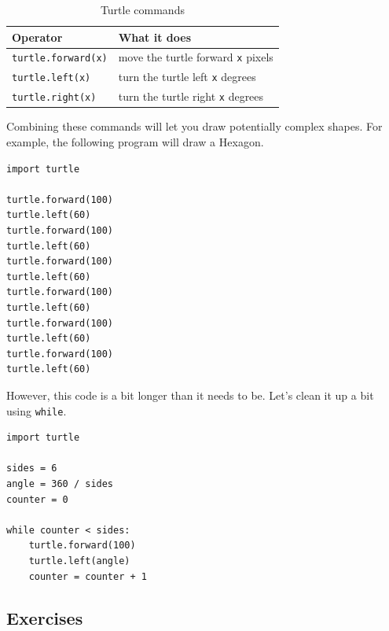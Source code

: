 \documentclass[11pt,hidelinks]{article}
\begin{document}
\begin{table}[h]
  \centering
  \begin{tabular}{ll}
    \toprule
    Operator & What it does\\
    \midrule
    \lstinline!turtle.forward(x)! & move the turtle forward \lstinline!x! pixels \\
    \lstinline!turtle.left(x)! & turn the turtle left \lstinline!x! degrees \\
    \lstinline!turtle.right(x)! & turn the turtle right \lstinline!x! degrees \\
    \bottomrule
  \end{tabular}
  \caption{Turtle commands}
  \label{tab:turtle}
\end{table}

Combining these commands will let you draw potentially complex shapes. For example, the following program will draw a Hexagon.

\begin{lstlisting}[style=python]
import turtle

turtle.forward(100)
turtle.left(60)
turtle.forward(100)
turtle.left(60)
turtle.forward(100)
turtle.left(60)
turtle.forward(100)
turtle.left(60)
turtle.forward(100)
turtle.left(60)
turtle.forward(100)
turtle.left(60)
\end{lstlisting}

However, this code is a bit longer than it needs to be. Let's clean it up a bit using \lstinline{while}.

\begin{lstlisting}[style=python]
import turtle

sides = 6
angle = 360 / sides
counter = 0

while counter < sides:
    turtle.forward(100)
    turtle.left(angle)
    counter = counter + 1
\end{lstlisting}

\subsection{Exercises}
\label{subsec:turtleex}
\end{document}
